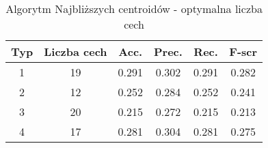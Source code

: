 		\begin{table}[h!]
			\centering
			\begin{tabular}{|| c | c | c  | c | c | c ||} 
				\hline
				Typ & Liczba cech & Acc. &  Prec. & Rec. & F-scr \\ [0.5ex] 
				\hline\hline
				1 & 19 & 0.291 & 0.302 & 0.291 & 0.282 \\ 
				2 & 12 &  0.252 & 0.284 & 0.252 & 0.241 \\
				3 & 20 &  0.215 & 0.272 & 0.215 & 0.213 \\
				4 & 17 &  0.281 & 0.304 & 0.281 & 0.275\\[1ex] 
				\hline
			\end{tabular}
			\caption{Algorytm Najbliższych centroidów - optymalna liczba cech}
			\label{6}
		\end{table}